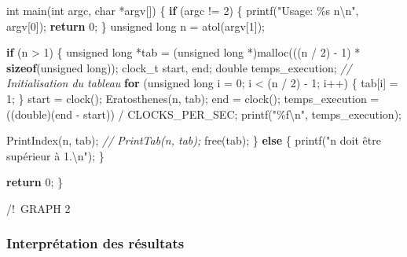 \documentclass[
    ]{article}
\newenvironment{Shaded}{}{}
\newcommand{\CommentTok}[1]{\textcolor[rgb]{0.38,0.63,0.69}{\textit{#1}}}
\newcommand{\ControlFlowTok}[1]{\textcolor[rgb]{0.00,0.44,0.13}{\textbf{#1}}}
\newcommand{\DataTypeTok}[1]{\textcolor[rgb]{0.56,0.13,0.00}{#1}}
\newcommand{\DecValTok}[1]{\textcolor[rgb]{0.25,0.63,0.44}{#1}}
\newcommand{\KeywordTok}[1]{\textcolor[rgb]{0.00,0.44,0.13}{\textbf{#1}}}
\newcommand{\NormalTok}[1]{#1}
\newcommand{\SpecialCharTok}[1]{\textcolor[rgb]{0.25,0.44,0.63}{#1}}
\newcommand{\StringTok}[1]{\textcolor[rgb]{0.25,0.44,0.63}{#1}}
\begin{document}
\begin{Shaded}
\begin{Highlighting}[]
\DataTypeTok{int}\NormalTok{ main(}\DataTypeTok{int}\NormalTok{ argc, }\DataTypeTok{char}\NormalTok{ *argv[])}
\NormalTok{\{}
    \ControlFlowTok{if}\NormalTok{ (argc != }\DecValTok{2}\NormalTok{)}
\NormalTok{    \{}
\NormalTok{        printf(}\StringTok{"Usage: \%s n}\SpecialCharTok{\textbackslash{}n}\StringTok{"}\NormalTok{, argv[}\DecValTok{0}\NormalTok{]);}
        \ControlFlowTok{return} \DecValTok{0}\NormalTok{;}
\NormalTok{    \}}
    \DataTypeTok{unsigned} \DataTypeTok{long}\NormalTok{ n = atol(argv[}\DecValTok{1}\NormalTok{]);}

    \ControlFlowTok{if}\NormalTok{ (n \textgreater{} }\DecValTok{1}\NormalTok{)}
\NormalTok{    \{}
        \DataTypeTok{unsigned} \DataTypeTok{long}\NormalTok{ *tab = (}\DataTypeTok{unsigned} \DataTypeTok{long}\NormalTok{ *)malloc(((n / }\DecValTok{2}\NormalTok{) {-} }\DecValTok{1}\NormalTok{) * }\KeywordTok{sizeof}\NormalTok{(}\DataTypeTok{unsigned} \DataTypeTok{long}\NormalTok{));}
\NormalTok{        clock\_t start, end;}
        \DataTypeTok{double}\NormalTok{ temps\_execution;}
        \CommentTok{// Initialisation du tableau}
        \ControlFlowTok{for}\NormalTok{ (}\DataTypeTok{unsigned} \DataTypeTok{long}\NormalTok{ i = }\DecValTok{0}\NormalTok{; i \textless{} (n / }\DecValTok{2}\NormalTok{) {-} }\DecValTok{1}\NormalTok{; i++)}
\NormalTok{        \{}
\NormalTok{            tab[i] = }\DecValTok{1}\NormalTok{;}
\NormalTok{        \}}
\NormalTok{        start = clock();}
\NormalTok{        Eratosthenes(n, tab);}
\NormalTok{        end = clock();}
\NormalTok{        temps\_execution = ((}\DataTypeTok{double}\NormalTok{)(end {-} start)) / CLOCKS\_PER\_SEC;}
\NormalTok{        printf(}\StringTok{"\%f}\SpecialCharTok{\textbackslash{}n}\StringTok{"}\NormalTok{, temps\_execution);}

\NormalTok{        PrintIndex(n, tab);}
        \CommentTok{// PrintTab(n, tab);}
\NormalTok{        free(tab);}
\NormalTok{    \}}
    \ControlFlowTok{else}
\NormalTok{    \{}
\NormalTok{        printf(}\StringTok{"n doit être supérieur à 1.}\SpecialCharTok{\textbackslash{}n}\StringTok{"}\NormalTok{);}
\NormalTok{    \}}

    \ControlFlowTok{return} \DecValTok{0}\NormalTok{;}
\NormalTok{\}}
\end{Highlighting}
\end{Shaded}

\pagebreak

/!~GRAPH 2\\
\pagebreak 

\hypertarget{interpruxe9tation-des-ruxe9sultats}{%
\subsubsection{Interprétation des
résultats}\label{interpruxe9tation-des-ruxe9sultats}}
\end{document}
